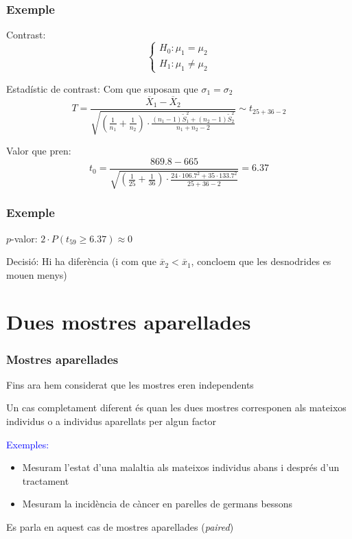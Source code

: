 \documentclass[12pt,t]{beamer}\usepackage[]{graphicx}\usepackage[]{color}
\newcommand{\blue}[1]{\textcolor{blue}{#1}}
\renewcommand{\emph}[1]{{\color{red}#1}}
\renewcommand{\geq}{\geqslant}
\theoremstyle{plain}
\theoremstyle{definition}
\begin{document}
\begin{frame}
\frametitle{Exemple}
\emph{Contrast}:
$$
\left\{\begin{array}{l}
H_0:\mu_1=\mu_2\\
H_1:\mu_1\neq \mu_2
\end{array}\right.
$$

\emph{Estadístic de contrast}: Com que suposam que $\sigma_1= \sigma_2$
$$
T=\frac{\overline{X}_1-\overline{X}_2}%
{\sqrt{(\frac{1}{n_1}+\frac{1}{n_2})\cdot 
\frac{(n_1-1)\widetilde{S}_1^2+(n_2-1)\widetilde{S}_2^2}%
{n_1+n_2-2}}}\sim t_{25+36-2}
$$

\medskip

\emph{Valor que pren}: 
$$
t_0=\frac{869.8-665}%
{\sqrt{(\frac{1}{25}+\frac{1}{36})\cdot 
\frac{24\cdot 106.7^2+35\cdot 133.7^2}%
{25+36-2}}}=6.37
$$
\end{frame}

\begin{frame}
\frametitle{Exemple}

\emph{$p$-valor}: 
$2\cdot P(t_{59}\geq 6.37)\approx 0$
\medskip

\emph{Decisió}: Hi ha diferència (i com que $\overline{x}_2<\overline{x}_1$, concloem que les desnodrides es mouen menys)
\end{frame}






\section{Dues mostres aparellades}

\begin{frame}
\frametitle{Mostres aparellades}

Fins ara hem considerat que les mostres eren independents
\medskip

Un cas completament diferent és quan les dues mostres corresponen als mateixos
individus o a individus aparellats per algun factor 
\medskip

\blue{Exemples:}
\begin{itemize}
\item Mesuram l'estat d'una malaltia als mateixos individus abans i després d'un tractament

\item Mesuram la incidència de càncer en parelles de germans bessons
\end{itemize}
Es parla en aquest cas de \emph{mostres aparellades} (\textsl{paired})
\end{frame}
\end{document}
